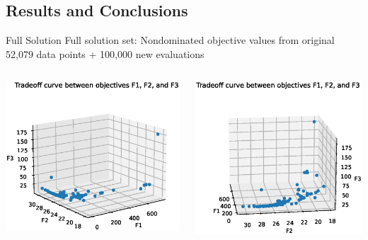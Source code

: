 \documentclass[aspectratio=169]{beamer}
\begin{document}
\subsection{Results and Conclusions}
\begin{frame}{Full Solution}
Full solution set:
Nondominated objective values from original 52,079 data points
+ 100,000 new evaluations
\begin{columns}
\begin{column}{0.5\textwidth}
\includegraphics[width=\textwidth]{soln_1.eps}
\end{column}
\begin{column}{0.5\textwidth}
\includegraphics[width=\textwidth]{soln_2.eps}
\end{column}
\end{columns}
\end{frame}
\end{document}

